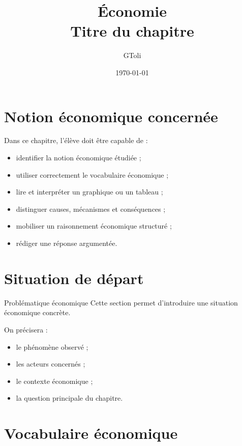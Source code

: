 \documentclass[11pt,a4paper]{article}
\title{\textbf{Économie}\\[0.2cm]
\large Titre du chapitre}
\author{GToli}
\date{\today}
\begin{document}
\maketitle

\section{Notion économique concernée}

\begin{cadreobjectif}
Dans ce chapitre, l’élève doit être capable de :
\begin{itemize}
    \item identifier la notion économique étudiée ;
    \item utiliser correctement le vocabulaire économique ;
    \item lire et interpréter un graphique ou un tableau ;
    \item distinguer causes, mécanismes et conséquences ;
    \item mobiliser un raisonnement économique structuré ;
    \item rédiger une réponse argumentée.
\end{itemize}
\end{cadreobjectif}

\section{Situation de départ}

\begin{cadrebleu}{Problématique économique}
Cette section permet d’introduire une situation économique concrète.

\medskip

On précisera :
\begin{itemize}
    \item le phénomène observé ;
    \item les acteurs concernés ;
    \item le contexte économique ;
    \item la question principale du chapitre.
\end{itemize}
\end{cadrebleu}

\section{Vocabulaire économique}
\end{document}
